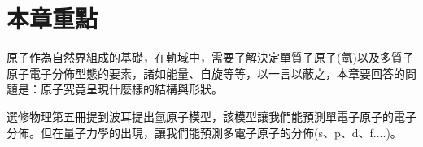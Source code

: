 \section{本章重點}
原子作為自然界組成的基礎，在軌域中，需要了解決定單質子原子(氫)以及多質子原子電子分佈型態的要素，諸如能量、自旋等等，以一言以蔽之，本章要回答的問題是：原子究竟呈現什麼樣的結構與形狀。

選修物理第五冊提到波耳提出氫原子模型，該模型讓我們能預測單電子原子的電子分佈。但在量子力學的出現，讓我們能預測多電子原子的分佈(s、p、d、f....)。
